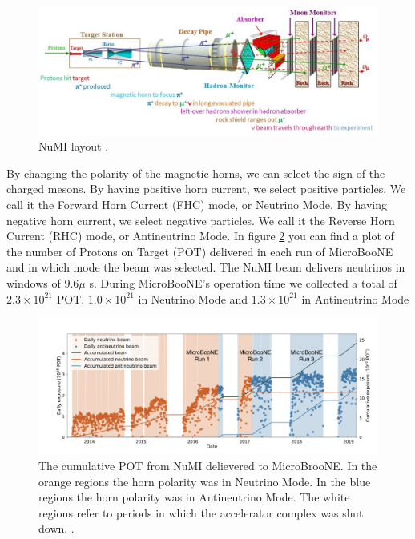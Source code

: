 \begin{figure}[h!]
    \centering
    \includegraphics[width=140mm]{Figures/numi.jpg}
    \caption{NuMI layout \cite{numi}.}
    \label{fig:numi}
\end{figure}

By changing the polarity of the magnetic horns, we can select the sign of the charged mesons. By having positive horn current, we select positive particles. We call it the Forward Horn Current (FHC) mode, or Neutrino Mode. By having negative horn current, we select negative particles. We call it the Reverse Horn Current (RHC) mode, or Antineutrino Mode. In figure \ref{beam_mode_uboone} you can find a plot of the number of Protons on Target (POT) delivered in each run of MicroBooNE and in which mode the beam was selected. The NuMI beam delivers neutrinos in windows of $9.6 \mu$ s. During MicroBooNE's operation time we collected a total of $2.3\times 10^{21}$ POT, $1.0\times10^{21}$ in Neutrino Mode and $1.3\times10^{21}$ in Antineutrino Mode

\begin{figure}[h!]
    \centering
    \includegraphics[width=150mm]{Figures/beam_mode_uboone.png}
    \caption{The cumulative POT from NuMI delievered to MicroBrooNE. In the orange regions the horn polarity was in Neutrino Mode. In the blue regions the horn polarity was in Antineutrino Mode. The white regions refer to periods in which the accelerator complex was shut down. \cite{krish_phd}.}
    \label{beam_mode_uboone}
\end{figure}

